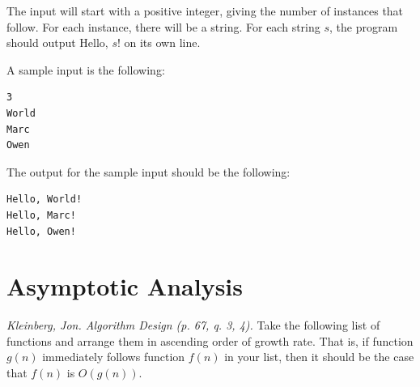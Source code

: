 \documentclass[solutionorbox, answers]{exam}
\begin{document}
\begin{questions}


\newpage
{}

The input will start with a positive integer, giving the number of instances that follow. For each instance, there will be a string. For each string $s$, the program should output Hello, $s$! on its own line.

A sample input is the following:
\begin{verbatim}
3
World
Marc
Owen
\end{verbatim}

The output for the sample input should be the following:
\begin{verbatim}
Hello, World!
Hello, Marc!
Hello, Owen!
\end{verbatim}

\newpage


\section*{Asymptotic Analysis}

  \question \textit{Kleinberg, Jon. Algorithm Design (p. 67, q. 3, 4).} Take the following list of functions and arrange them in ascending order of growth rate. That is, if function $g(n)$ immediately follows function $f(n)$ in your list, then it should be the case that $f(n)$ is $O(g(n))$. 

\end{questions}
\end{document}

